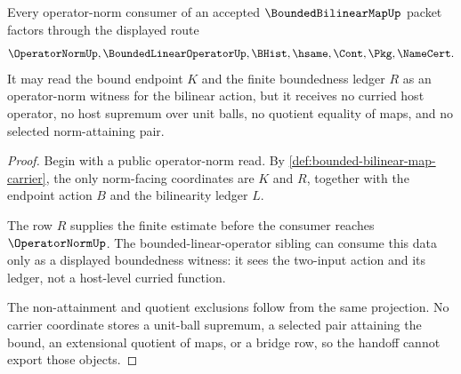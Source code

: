 \begin{theorem}
\label{thm:bounded-bilinear-map-operator-norm-handoff}
Every operator-norm consumer of an accepted $\BoundedBilinearMapUp$ packet factors through the displayed route
$$
\OperatorNormUp,\BoundedLinearOperatorUp,\BHist,\hsame,\Cont,\Pkg,\NameCert .
$$
It may read the bound endpoint $K$ and the finite boundedness ledger $R$ as an operator-norm witness for the bilinear action, but it receives no curried host operator, no host supremum over unit balls, no quotient equality of maps, and no selected norm-attaining pair.
\end{theorem}
\begin{proof}
Begin with a public operator-norm read. By \autoref{def:bounded-bilinear-map-carrier}, the only norm-facing coordinates are $K$ and $R$, together with the endpoint action $B$ and the bilinearity ledger $L$.

The row $R$ supplies the finite estimate before the consumer reaches $\OperatorNormUp$. The bounded-linear-operator sibling can consume this data only as a displayed boundedness witness: it sees the two-input action and its ledger, not a host-level curried function.

The non-attainment and quotient exclusions follow from the same projection. No carrier coordinate stores a unit-ball supremum, a selected pair attaining the bound, an extensional quotient of maps, or a bridge row, so the handoff cannot export those objects.
\end{proof}

